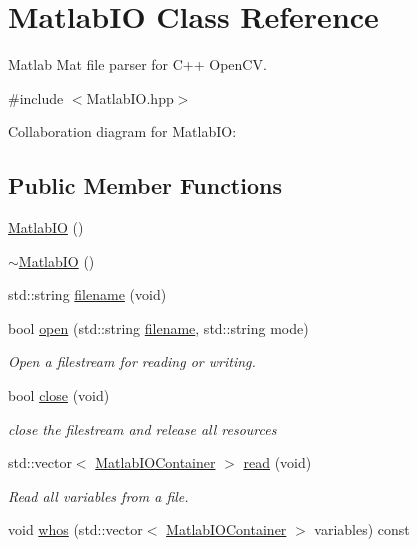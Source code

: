 \hypertarget{classMatlabIO}{}\section{Matlab\+I\+O Class Reference}
\label{classMatlabIO}


Matlab Mat file parser for C++ Open\+C\+V.  




{\ttfamily \#include $<$Matlab\+I\+O.\+hpp$>$}



Collaboration diagram for Matlab\+I\+O\+:
\subsection*{Public Member Functions}
\begin{DoxyCompactItemize}
\item 
\hyperlink{classMatlabIO_aff789857e946a732c81e340858d99577}{Matlab\+I\+O} ()
\item 
\hyperlink{classMatlabIO_acdc6545c9c9a09ff63965a65beebc1d7}{$\sim$\+Matlab\+I\+O} ()
\item 
std\+::string \hyperlink{classMatlabIO_ac14e19dce8bde88ffaac0ef062e77f8c}{filename} (void)
\item 
bool \hyperlink{classMatlabIO_a8827f80e835be574147e416397d7136d}{open} (std\+::string \hyperlink{classMatlabIO_ac14e19dce8bde88ffaac0ef062e77f8c}{filename}, std\+::string mode)
\begin{DoxyCompactList}\small\item\em Open a filestream for reading or writing. \end{DoxyCompactList}\item 
bool \hyperlink{classMatlabIO_a77a8a636fd3069dab8b8cf27998eeaf3}{close} (void)
\begin{DoxyCompactList}\small\item\em close the filestream and release all resources \end{DoxyCompactList}\item 
std\+::vector$<$ \hyperlink{classMatlabIOContainer}{Matlab\+I\+O\+Container} $>$ \hyperlink{classMatlabIO_aa6bcbec37f79990c3b9b5cd1d4d15c1c}{read} (void)
\begin{DoxyCompactList}\small\item\em Read all variables from a file. \end{DoxyCompactList}\item 
void \hyperlink{classMatlabIO_a9ee52feb6ef61a3c8976da05757d40d1}{whos} (std\+::vector$<$ \hyperlink{classMatlabIOContainer}{Matlab\+I\+O\+Container} $>$ variables) const 

\end{DoxyCompactItemize}
